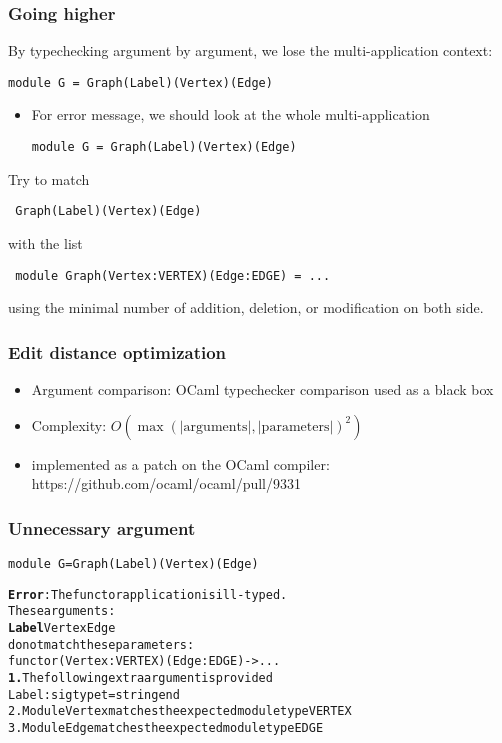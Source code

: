\documentclass[a4paper,11pt]{beamer}
\begin{document}
\begin{frame}[fragile]\frametitle{Going higher}

  By typechecking argument by argument, we lose the multi-application
  context:
\begin{verbatim}
module G = Graph(Label)(Vertex)(Edge)
\end{verbatim}

  \begin{itemize}
      \item For error message, we should look at the whole multi-application
\begin{verbatim}
module G = Graph(Label)(Vertex)(Edge)
\end{verbatim}

  \end{itemize}
Try to match
\begin{verbatim}
 Graph(Label)(Vertex)(Edge)
\end{verbatim}
with the list
\begin{verbatim}
 module Graph(Vertex:VERTEX)(Edge:EDGE) = ...
\end{verbatim}

using the minimal number of addition, deletion, or modification on both side.

\end{frame}

\begin{frame}\frametitle{Edit distance optimization}
  \begin{itemize}
    \item{Argument comparison: OCaml typechecker comparison used as a black box}
    \item{Complexity: $O(\max(\mathrm{|arguments|,|parameters|})^2)$}
    \item{implemented as a patch on the OCaml compiler:
      https://github.com/ocaml/ocaml/pull/9331 }
  \end{itemize}
\end{frame}


\begin{frame}[fragile]\frametitle{Unnecessary argument}
\begin{verbatim}
module G=Graph(Label)(Vertex)(Edge)
\end{verbatim}
\begin{alltt}
{\bfseries{}\color{red}{}Error}: The functor application is ill-typed.
       These arguments:
         {\color{red}{}\bfseries{}Label} {\color{green}{}Vertex} {\color{green}{}Edge}
       do not match these parameters:
         functor {\color{red}{}\bfseries{}} {\color{green}{}(Vertex : VERTEX)} {\color{green}{}(Edge : EDGE)} -> ...
  {\color{red}{}\bfseries{}1.} The following extra argument is provided
      Label : sig type t = string end
  {\color{green}{}2.} Module Vertex matches the expected module type VERTEX
  {\color{green}{}3.} Module Edge matches the expected module type EDGE
\end{alltt}
\end{frame}
\end{document}
